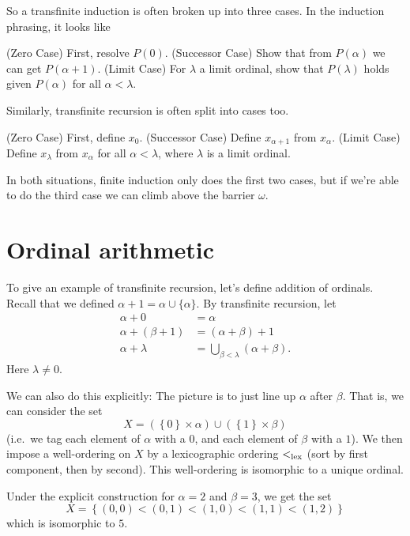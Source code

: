 So a transfinite induction is often broken up into three cases.
In the induction phrasing, it looks like
\begin{itemize}
	\ii (Zero Case) First, resolve $P(0)$.
	\ii (Successor Case) Show that from $P(\alpha)$ we can get $P(\alpha+1)$.
	\ii (Limit Case) For $\lambda$ a limit ordinal,
	show that $P(\lambda)$ holds given $P(\alpha)$ for all $\alpha < \lambda$.
\end{itemize}
Similarly, transfinite recursion is often split into cases too.
\begin{itemize}
	\ii (Zero Case) First, define $x_0$.
	\ii (Successor Case) Define $x_{\alpha+1}$ from $x_\alpha$.
	\ii (Limit Case) Define $x_\lambda$ from $x_\alpha$ for all $\alpha < \lambda$,
	where $\lambda$ is a limit ordinal.
\end{itemize}
In both situations, finite induction only does the first two cases,
but if we're able to do the third case we can climb above the barrier $\omega$.

\section{Ordinal arithmetic}
To give an example of transfinite recursion, let's define addition of ordinals.
Recall that we defined $\alpha+1 = \alpha \cup \{\alpha\}$.
By transfinite recursion, let
\begin{align*}
	\alpha + 0 &= \alpha \\
	\alpha + (\beta + 1) &= (\alpha + \beta) + 1 \\
	\alpha + \lambda &= \bigcup_{\beta < \lambda} (\alpha + \beta).
\end{align*}
Here $\lambda \neq 0$.

We can also do this explicitly:
The picture is to just line up $\alpha$ after $\beta$.
That is, we can consider the set
\[
	X =
	\left( \left\{ 0 \right\} \times \alpha \right)
	\cup
	\left( \left\{ 1 \right\} \times \beta \right)
\]
(i.e.\ we tag each element of $\alpha$ with a $0$, and
each element of $\beta$ with a $1$).
We then impose a well-ordering on $X$ by a lexicographic ordering $<_{\text{lex}}$
(sort by first component, then by second).
This well-ordering is isomorphic to a unique ordinal.
\begin{example}
	[$2+3=5$]
	Under the explicit construction for $\alpha = 2$ and $\beta = 3$, we get the set
	\[
		X = \left\{ (0,0) < (0,1) < (1,0) < (1,1) < (1,2) \right\}
	\]
	which is isomorphic to $5$.
\end{example}


